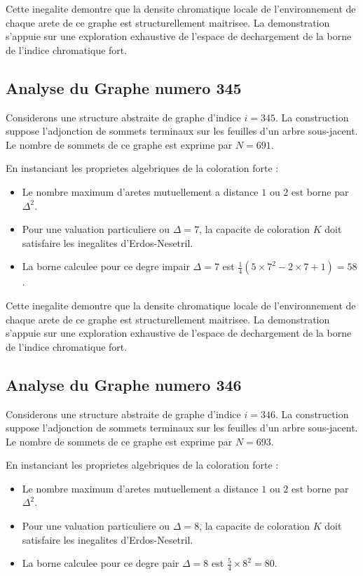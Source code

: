 \documentclass[11pt,a4paper]{article}
\begin{document}
Cette inegalite demontre que la densite chromatique locale de l'environnement de chaque arete de ce graphe est structurellement maitrisee. La demonstration s'appuie sur une exploration exhaustive de l'espace de dechargement de la borne de l'indice chromatique fort.

\subsection{Analyse du Graphe numero 345}
Considerons une structure abstraite de graphe d'indice $i = 345$. La construction suppose l'adjonction de sommets terminaux sur les feuilles d'un arbre sous-jacent. Le nombre de sommets de ce graphe est exprime par $N = 691$.

En instanciant les proprietes algebriques de la coloration forte :
\begin{itemize}
\item Le nombre maximum d'aretes mutuellement a distance $1$ ou $2$ est borne par $\Delta^2$.
\item Pour une valuation particuliere ou $\Delta = 7$, la capacite de coloration $K$ doit satisfaire les inegalites d'Erdos-Nesetril.
\item La borne calculee pour ce degre impair $\Delta = 7$ est $\frac{1}{4}(5 \times 7^2 - 2 \times 7 + 1) = 58$.
\end{itemize}

Cette inegalite demontre que la densite chromatique locale de l'environnement de chaque arete de ce graphe est structurellement maitrisee. La demonstration s'appuie sur une exploration exhaustive de l'espace de dechargement de la borne de l'indice chromatique fort.

\subsection{Analyse du Graphe numero 346}
Considerons une structure abstraite de graphe d'indice $i = 346$. La construction suppose l'adjonction de sommets terminaux sur les feuilles d'un arbre sous-jacent. Le nombre de sommets de ce graphe est exprime par $N = 693$.

En instanciant les proprietes algebriques de la coloration forte :
\begin{itemize}
\item Le nombre maximum d'aretes mutuellement a distance $1$ ou $2$ est borne par $\Delta^2$.
\item Pour une valuation particuliere ou $\Delta = 8$, la capacite de coloration $K$ doit satisfaire les inegalites d'Erdos-Nesetril.
\item La borne calculee pour ce degre pair $\Delta = 8$ est $\frac{5}{4} \times 8^2 = 80$.
\end{itemize}
\end{document}
